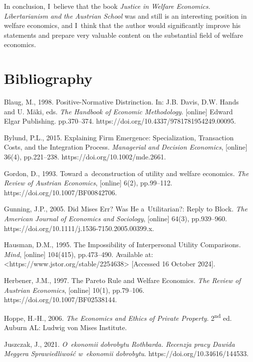 In conclusion, I~believe that the book \textit{Justice in Welfare Economics. Libertarianism and the Austrian School} was and still is an interesting position in welfare economics, and I~think that the author would significantly improve his statements and prepare very valuable content on the substantial field of welfare economics.



\section{Bibliography}

Blaug, M., 1998. Positive-Normative Distrinction. In: J.B. Davis, D.W. Hands and U. Mäki, eds. \textit{The Handbook of Economic Methodology}. [online] Edward Elgar Publishing. pp.370–374. https://doi.org/10.4337/9781781954249.00095.



Bylund, P.L., 2015. Explaining Firm Emergence: Specialization, Transaction Costs, and the Integration Process. \textit{Managerial and Decision Economics}, [online] 36(4), pp.221–238. https://doi.org/10.1002/mde.2661.



Gordon, D., 1993. Toward a~deconstruction of utility and welfare economics. \textit{The Review of Austrian Economics}, [online] 6(2), pp.99–112. https://doi.org/10.1007/BF00842706.



Gunning, J.P., 2005. Did Mises Err? Was He a~Utilitarian?: Reply to Block. \textit{The American Journal of Economics and Sociology}, [online] 64(3), pp.939–960. https://doi.org/10.1111/j.1536-7150.2005.00399.x.



Hausman, D.M., 1995. The Impossibility of Interpersonal Utility Comparisons. \textit{Mind}, [online] 104(415), pp.473–490. Available at: {\textless}https://www.jstor.org/stable/2254638{\textgreater} [Accessed 16 October 2024].



Herbener, J.M., 1997. The Pareto Rule and Welfare Economics. \textit{The Review of Austrian Economics}, [online] 10(1), pp.79–106. https://doi.org/10.1007/BF02538144.



Hoppe, H.-H., 2006. \textit{The Economics and Ethics of Private Property}. 2\textsuperscript{nd} ed. Auburn AL: Ludwig von Mises Institute.



Juszczak, J., 2021. \textit{O~ekonomii dobrobytu Rothbarda. Recenzja pracy Dawida Meggera Sprawiedliwość w~ekonomii dobrobytu}. https://doi.org/10.34616/144533.



